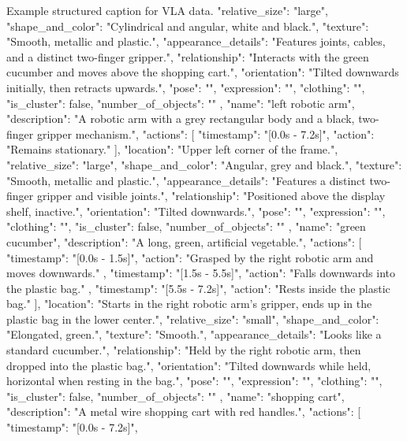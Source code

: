 \begin{captionexample}{Example structured caption for VLA data.}
{{      "relative_size": "large",
      "shape_and_color": "Cylindrical and angular, white and black.",
      "texture": "Smooth, metallic and plastic.",
      "appearance_details": "Features joints, cables, and a distinct two-finger gripper.",
      "relationship": "Interacts with the green cucumber and moves above the shopping cart.",
      "orientation": "Tilted downwards initially, then retracts upwards.",
      "pose": "",
      "expression": "",
      "clothing": "",
      "is_cluster": false,
      "number_of_objects": ""
    },
    {
      "name": "left robotic arm",
      "description": "A robotic arm with a grey rectangular body and a black, two-finger gripper mechanism.",
      "actions": [
        {
          "timestamp": "[0.0s - 7.2s]",
          "action": "Remains stationary."
        }
      ],
      "location": "Upper left corner of the frame.",
      "relative_size": "large",
      "shape_and_color": "Angular, grey and black.",
      "texture": "Smooth, metallic and plastic.",
      "appearance_details": "Features a distinct two-finger gripper and visible joints.",
      "relationship": "Positioned above the display shelf, inactive.",
      "orientation": "Tilted downwards.",
      "pose": "",
      "expression": "",
      "clothing": "",
      "is_cluster": false,
      "number_of_objects": ""
    },
    {
      "name": "green cucumber",
      "description": "A long, green, artificial vegetable.",
      "actions": [
        {
          "timestamp": "[0.0s - 1.5s]",
          "action": "Grasped by the right robotic arm and moves downwards."
        },
        {
          "timestamp": "[1.5s - 5.5s]",
          "action": "Falls downwards into the plastic bag."
        },
        {
          "timestamp": "[5.5s - 7.2s]",
          "action": "Rests inside the plastic bag."
        }
      ],
      "location": "Starts in the right robotic arm's gripper, ends up in the plastic bag in the lower center.",
      "relative_size": "small",
      "shape_and_color": "Elongated, green.",
      "texture": "Smooth.",
      "appearance_details": "Looks like a standard cucumber.",
      "relationship": "Held by the right robotic arm, then dropped into the plastic bag.",
      "orientation": "Tilted downwards while held, horizontal when resting in the bag.",
      "pose": "",
      "expression": "",
      "clothing": "",
      "is_cluster": false,
      "number_of_objects": ""
    },
    {
      "name": "shopping cart",
      "description": "A metal wire shopping cart with red handles.",
      "actions": [
        {
          "timestamp": "[0.0s - 7.2s]",
}}}
\end{captionexample}
